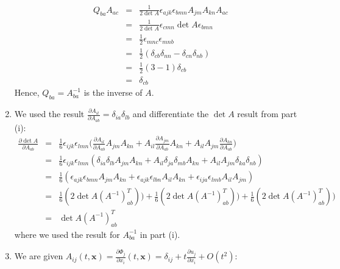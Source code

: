 \documentclass[a4paper]{article}
\begin{document}
\begin{ans}
\begin{enumerate}[label=(\roman*)]
\begin{eqnarray}
Q_{ba}A_{ac}&=&\frac{1}{2\det A}\epsilon_{ajk}\epsilon_{bmn}A_{jm}A_{kn}A_{ac}\nonumber\\&=&\frac{1}{2\det A}\epsilon_{cmn}\det A\epsilon_{bmn}\nonumber\\&=&\frac{1}{2}\epsilon_{mnc}\epsilon_{mnb}\nonumber\\&=&\frac{1}{2}(\delta_{cb}\delta_{nn}-\delta_{cn}\delta_{nb})\nonumber\\&=&\frac{1}{2}(3-1)\delta_{cb}\nonumber\\&=&\delta_{cb}\nonumber
\end{eqnarray}
Hence, $Q_{ba}=A_{ba}^{-1}$ is the inverse of $A$.
\item We used the result $\frac{\partial A_{il}}{\partial A_{ab}}=\delta_{ia}\delta_{lb}$ and differentiate the $\det A$ result from part (i):
\begin{eqnarray}
\frac{\partial\det A}{\partial A_{ab}}&=&\frac{1}{6}\epsilon_{ijk}\epsilon_{lmn}\bigg(\frac{\partial A_{il}}{\partial A_{ab}}A_{jm}A_{kn}+A_{il}\frac{\partial A_{jm}}{\partial A_{ab}}A_{kn}+A_{il}A_{jm}\frac{\partial A_{kn}}{\partial A_{ab}}\bigg)\nonumber\\&=&\frac{1}{6}\epsilon_{ijk}\epsilon_{lmn}(\delta_{ia}\delta_{lb}A_{jm}A_{kn}+A_{il}\delta_{ja}\delta_{mb}A_{kn}+A_{il}A_{jm}\delta_{ka}\delta_{nb})\nonumber\\&=&\frac{1}{6}(\epsilon_{ajk}\epsilon_{bmn}A_{jm}A_{kn}+\epsilon_{ajk}\epsilon_{lbn}A_{il}A_{kn}+\epsilon_{ija}\epsilon_{lmb}A_{il}A_{jm})\nonumber\\&=&\frac{1}{6}(2\det A (A^{-1})_{ab}^T))+\frac{1}{6}(2\det A (A^{-1})_{ab}^T))+\frac{1}{6}(2\det A (A^{-1})_{ab}^T))\nonumber\\&=&\det A (A^{-1})^T_{ab}\nonumber
\end{eqnarray}
where we used the result for $A^{-1}_{ba}$ in part (i).
\item We are given $A_{ij}(t,\mathbf{x})=\frac{\partial\Phi_j}{\partial x_i}(t,\mathbf{x})=\delta_{ij}+t\frac{\partial u_j}{\partial x_i}+O(t^2)$:
\begin{eqnarray}

\end{eqnarray}
\end{enumerate}
\end{ans}
\end{document}
